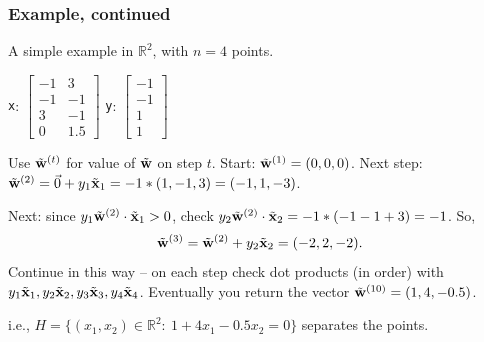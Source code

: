 \documentclass{beamer}
\theoremstyle{example}
\newcommand{\ttt}[1]{{\small\texttt{#1}}}
\begin{document}
\begin{frame}
    \frametitle{Example, continued}
    A simple example in $\mathbb R^2$, with $n=4$ points.

    \begin{center}
    \ttt{x}: $\begin{bmatrix}-1 & 3 \\ -1 & -1 \\ 3 & -1 \\ 0 & 1.5\end{bmatrix}$  \qquad\qquad
    \ttt{y}: $\begin{bmatrix}-1 \\ -1 \\ 1 \\ 1\end{bmatrix}$
    \end{center}

    Use $\tilde{\bf w}^{(t)}$ for value of $\tilde{\bf w}$ on step $t$. Start: $\tilde{\bf w}^{(1)} = (0,0,0)$. \newline 
    Next step: $\tilde{\bf w}^{(2)} = \vec{0} + y_1\tilde{\bf x}_1 = -1\ast(1,-1,3) = (-1,1,-3)$.
    \pause
    
    Next: since $y_1\tilde{\bf w}^{(2)}\cdot \tilde{\bf x}_1 > 0$, check $y_2\tilde{\bf w}^{(2)}\cdot \tilde{\bf x}_2 = -1\ast(-1 -1 + 3) = -1$. \pause
    So, 
        \[\tilde{\bf w}^{(3)} = \tilde{\bf w}^{(2)} + y_2\tilde{\bf x}_2 = (-2, 2, -2).\]
    \pause 
    Continue in this way {--} on each step check dot products (in order) with $y_1\tilde{\bf x}_1, y_2\tilde{\bf x}_2, y_3\tilde{\bf x}_3, y_4\tilde{\bf x}_4$. Eventually you return the vector $\tilde{\bf w}^{(10)} = (1, 4, -0.5)$. 
    
    \pause
    i.e., $H = \{(x_1,x_2)\in \mathbb R^2:\ 1 + 4x_1-0.5x_2 = 0\}$ separates the points.
\end{frame}
\end{document}
